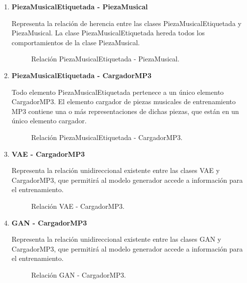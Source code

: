 \begin{enumerate}
  \item \textbf{PiezaMusicalEtiquetada - PiezaMusical}

  Representa la relación de herencia entre las clases PiezaMusicalEtiquetada y PiezaMusical. La clase PiezaMusicalEtiquetada hereda todos los comportamientos de la clase PiezaMusical.

  \begin{figure}[H]
    \centering
    
    \caption{Relación PiezaMusicalEtiquetada - PiezaMusical.}
  \end{figure}

  \item \textbf{PiezaMusicalEtiquetada - CargadorMP3}

  Todo elemento PiezaMusicalEtiquetada pertenece a un único elemento CargadorMP3. El elemento cargador de piezas musicales de entrenamiento MP3 contiene una o más representaciones de dichas piezas, que están en un único elemento cargador.

  \begin{figure}[H]
    \centering
    
    \caption{Relación PiezaMusicalEtiquetada - CargadorMP3.}
  \end{figure}

  \item \textbf{VAE - CargadorMP3}

  Representa la relación unidireccional existente entre las clases VAE y CargadorMP3, que permitirá al modelo generador accede a información para el entrenamiento.

  \begin{figure}[H]
    \centering
    
    \caption{Relación VAE - CargadorMP3.}
  \end{figure}

  \item \textbf{GAN - CargadorMP3}

  Representa la relación unidireccional existente entre las clases GAN y CargadorMP3, que permitirá al modelo generador accede a información para el entrenamiento.

  \begin{figure}[H]
    \centering
    
    \caption{Relación GAN - CargadorMP3.}
  \end{figure}


\end{enumerate}
